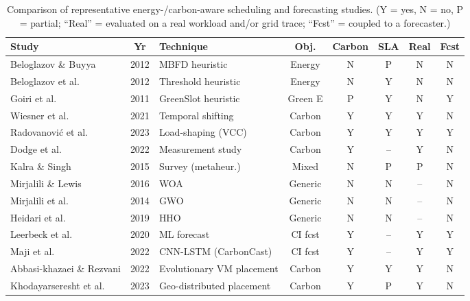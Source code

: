 \documentclass[12pt,a4paper]{article}
\providecommand{\DIFaddbegin}{} %
\providecommand{\DIFdelend}{} %
\providecommand{\DIFaddincludegraphics}[2][]{{\color{blue}\fbox{\DIFOincludegraphics[#1]{#2}}}} %
\DeclareRobustCommand{\DIFaddbegin}{\DIFOaddbegin \let\includegraphics\DIFaddincludegraphics} %
\DeclareRobustCommand{\DIFdelend}{\DIFOaddend \let\includegraphics\DIFOincludegraphics} %
\begin{document}
\DIFdelend \DIFaddbegin \begin{table}[H]\centering
\footnotesize
\setlength{\tabcolsep}{3.5pt}
\caption{Comparison of representative energy-/carbon-aware scheduling and forecasting studies.
(Y = yes, N = no, P = partial; ``Real'' = evaluated on a real workload and/or grid trace; ``Fcst'' = coupled to a forecaster.)}
\label{tab:related}
\begin{tabular}{@{}p{2.35cm}cp{1.9cm}ccccc@{}}
\toprule
Study & Yr & Technique & Obj. & Carbon & SLA & Real & Fcst \\
\midrule
Beloglazov \& Buyya \cite{beloglazov2012optimal} & 2012 & MBFD heuristic & Energy & N & P & N & N \\
Beloglazov et al. \cite{beloglazov2012energy} & 2012 & Threshold heuristic & Energy & N & Y & N & N \\
Goiri et al. \cite{goiri2011greenslot} & 2011 & GreenSlot heuristic & Green E & P & Y & N & Y \\
Wiesner et al. \cite{wiesner2021lets} & 2021 & Temporal shifting & Carbon & Y & Y & Y & N \\
Radovanovi\'c et al. \cite{radovanovic2023carbon} & 2023 & Load-shaping (VCC) & Carbon & Y & Y & Y & Y \\
Dodge et al. \cite{dodge2022measuring} & 2022 & Measurement study & Carbon & Y & -- & Y & N \\
Kalra \& Singh \cite{kalra2015review} & 2015 & Survey (metaheur.) & Mixed & N & P & P & N \\
Mirjalili \& Lewis \cite{mirjalili2016whale} & 2016 & WOA & Generic & N & N & -- & N \\
Mirjalili et al. \cite{mirjalili2014grey} & 2014 & GWO & Generic & N & N & -- & N \\
Heidari et al. \cite{heidari2019harris} & 2019 & HHO & Generic & N & N & -- & N \\
Leerbeck et al. \cite{leerbeck2020short} & 2020 & ML forecast & CI fcst & Y & -- & Y & Y \\
Maji et al. \cite{maji2022carboncast} & 2022 & CNN-LSTM (CarbonCast) & CI fcst & Y & -- & Y & Y \\
Abbasi-khazaei \& Rezvani \cite{abbasikhazaei2022energy} & 2022 & Evolutionary VM placement & Carbon & Y & Y & Y & N \\
Khodayarseresht et al. \cite{khodayarseresht2023energy} & 2023 & Geo-distributed placement & Carbon & Y & P & Y & N \\

\end{tabular}
\end{table}
\end{document}
